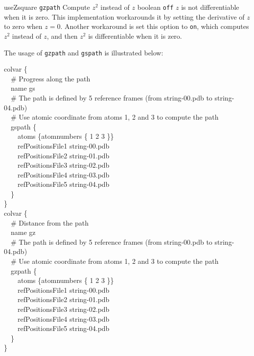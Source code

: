
\begin{cvcoptions}

\item %
  \keydef
    {useZsquare}{%
    \texttt{gzpath}}{%
    Compute $z^2$ instead of $z$}{%
    boolean}{%
    \texttt{off}}{%
    $z$ is not differentiable when it is zero. This implementation workarounds it by setting the derivative of $z$ to zero when $z = 0$. Another workaround is set this option to \texttt{on}, which computes $z^2$ instead of $z$, and then $z^2$ is differentiable when it is zero.
  }

\end{cvcoptions}

The usage of \texttt{gzpath} and \texttt{gspath} is illustrated below:

\begin{cvexampleinput}
colvar \{\\
\-~~\# Progress along the path\\
\-~~name gs\\
\-~~\# The path is defined by 5 reference frames (from string-00.pdb to string-04.pdb)\\
\-~~\# Use atomic coordinate from atoms 1, 2 and 3 to compute the path\\
\-~~gspath \{\\
\-~~~~atoms \{atomnumbers \{ 1 2 3 \}\}\\
\-~~~~refPositionsFile1 string-00.pdb\\
\-~~~~refPositionsFile2 string-01.pdb\\
\-~~~~refPositionsFile3 string-02.pdb\\
\-~~~~refPositionsFile4 string-03.pdb\\
\-~~~~refPositionsFile5 string-04.pdb\\
\-~~\}\\
\}\\
\noindent\ttfamily colvar \{\\
\-~~\# Distance from the path\\
\-~~name gz\\
\-~~\# The path is defined by 5 reference frames (from string-00.pdb to string-04.pdb)\\
\-~~\# Use atomic coordinate from atoms 1, 2 and 3 to compute the path\\
\-~~gzpath \{\\
\-~~~~atoms \{atomnumbers \{ 1 2 3 \}\}\\
\-~~~~refPositionsFile1 string-00.pdb\\
\-~~~~refPositionsFile2 string-01.pdb\\
\-~~~~refPositionsFile3 string-02.pdb\\
\-~~~~refPositionsFile4 string-03.pdb\\
\-~~~~refPositionsFile5 string-04.pdb\\
\-~~\}\\
\}
\end{cvexampleinput}


